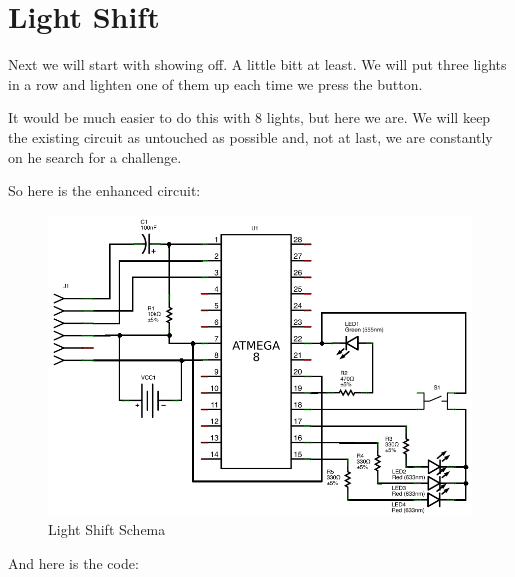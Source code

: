 \section{Light Shift}

Next we will start with showing off. A little bitt at least. We will put three lights in a row and lighten one of them up each time we press the button.

It would be much easier to do this with 8 lights, but here we are. We will keep the existing circuit as untouched as possible and, not at last, we are constantly on he search for a challenge.

So here is the enhanced circuit:

\begin{figure}[htbp]
  \centering
  \includegraphics[width=120mm]{LED/S010_light-shift_Circuit_schema.png}
  \caption{Light Shift Schema}
  \label{atmega8-light-shift-schema}
\end{figure}


And here is the code:

